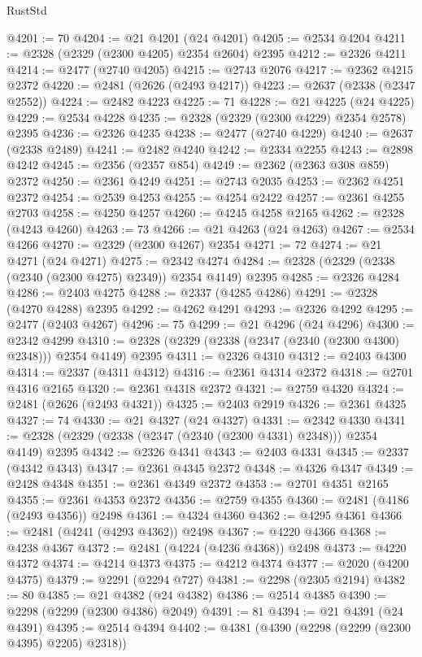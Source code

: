 \begin{lexlean}{RustStd}
\begin{coremodule}
{\begin{coremodule}
{{{{{{{{{{{{{{{{{{{{{{{{{{{{{{{{{{{{{@4201 := 70
@4204 := @21 @4201 (@24 @4201)
@4205 := @2534 @4204
@4211 := @2328 (@2329 (@2300 @4205) @2354 @2604) @2395
@4212 := @2326 @4211
@4214 := @2477 (@2740 @4205)
@4215 := @2743 @2076
@4217 := @2362 @4215 @2372
@4220 := @2481 (@2626 (@2493 @4217))
@4223 := @2637 (@2338 (@2347 @2552))
@4224 := @2482 @4223
@4225 := 71
@4228 := @21 @4225 (@24 @4225)
@4229 := @2534 @4228
@4235 := @2328 (@2329 (@2300 @4229) @2354 @2578) @2395
@4236 := @2326 @4235
@4238 := @2477 (@2740 @4229)
@4240 := @2637 (@2338 @2489)
@4241 := @2482 @4240
@4242 := @2334 @2255
@4243 := @2898 @4242
@4245 := @2356 (@2357 @854)
@4249 := @2362 (@2363 @308 @859) @2372
@4250 := @2361 @4249
@4251 := @2743 @2035
@4253 := @2362 @4251 @2372
@4254 := @2539 @4253
@4255 := @4254 @2422
@4257 := @2361 @4255 @2703
@4258 := @4250 @4257
@4260 := @4245 @4258 @2165
@4262 := @2328 (@4243 @4260)
@4263 := 73
@4266 := @21 @4263 (@24 @4263)
@4267 := @2534 @4266
@4270 := @2329 (@2300 @4267) @2354
@4271 := 72
@4274 := @21 @4271 (@24 @4271)
@4275 := @2342 @4274
@4284 := @2328 (@2329 (@2338 (@2340 (@2300 @4275) @2349)) @2354 @4149) @2395
@4285 := @2326 @4284
@4286 := @2403 @4275
@4288 := @2337 (@4285 @4286)
@4291 := @2328 (@4270 @4288) @2395
@4292 := @4262 @4291
@4293 := @2326 @4292
@4295 := @2477 (@2403 @4267)
@4296 := 75
@4299 := @21 @4296 (@24 @4296)
@4300 := @2342 @4299
@4310 := @2328 (@2329 (@2338 (@2347 (@2340 (@2300 @4300) @2348))) @2354 @4149) @2395
@4311 := @2326 @4310
@4312 := @2403 @4300
@4314 := @2337 (@4311 @4312)
@4316 := @2361 @4314 @2372
@4318 := @2701 @4316 @2165
@4320 := @2361 @4318 @2372
@4321 := @2759 @4320
@4324 := @2481 (@2626 (@2493 @4321))
@4325 := @2403 @2919
@4326 := @2361 @4325
@4327 := 74
@4330 := @21 @4327 (@24 @4327)
@4331 := @2342 @4330
@4341 := @2328 (@2329 (@2338 (@2347 (@2340 (@2300 @4331) @2348))) @2354 @4149) @2395
@4342 := @2326 @4341
@4343 := @2403 @4331
@4345 := @2337 (@4342 @4343)
@4347 := @2361 @4345 @2372
@4348 := @4326 @4347
@4349 := @2428 @4348
@4351 := @2361 @4349 @2372
@4353 := @2701 @4351 @2165
@4355 := @2361 @4353 @2372
@4356 := @2759 @4355
@4360 := @2481 (@4186 (@2493 @4356)) @2498
@4361 := @4324 @4360
@4362 := @4295 @4361
@4366 := @2481 (@4241 (@4293 @4362)) @2498
@4367 := @4220 @4366
@4368 := @4238 @4367
@4372 := @2481 (@4224 (@4236 @4368)) @2498
@4373 := @4220 @4372
@4374 := @4214 @4373
@4375 := @4212 @4374
@4377 := @2020 (@4200 @4375)
@4379 := @2291 (@2294 @727)
@4381 := @2298 (@2305 @2194)
@4382 := 80
@4385 := @21 @4382 (@24 @4382)
@4386 := @2514 @4385
@4390 := @2298 (@2299 (@2300 @4386) @2049)
@4391 := 81
@4394 := @21 @4391 (@24 @4391)
@4395 := @2514 @4394
@4402 := @4381 (@4390 (@2298 (@2299 (@2300 @4395) @2205) @2318))
}}}}}}}}}}}}}}}}}}}}}}}}}}}}}}}}}}}}}
\end{coremodule}}
\end{coremodule}
\end{lexlean}
